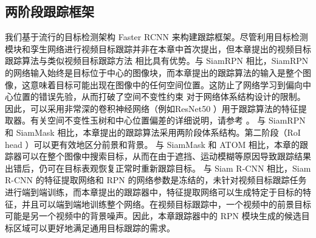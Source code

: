 \subsection{两阶段跟踪框架}

我们基于流行的目标检测架构 Faster RCNN \cite{ren2015faster} 来构建跟踪框架。尽管利用目标检测模块和孪生网络进行视频目标跟踪并非在本章中首次提出，但本章提出的视频目标跟踪算法与类似视频目标跟踪方法 \cite{SiamRPN, Wang2018SiamMask, danelljan2019atom, voigtlaender2019siam} 相比具有优势。与 SiamRPN \cite{SiamRPN}相比，SiamRPN 的网络输入始终是目标位于中心的图像块，而本章提出的跟踪算法的输入是整个图像，这意味着目标可能出现在图像中的任何空间位置。这防止了网络学习到偏向中心位置的错误先验，从而打破了空间不变性约束 \cite{SiamRPN++} 对于网络体系结构设计的限制。因此，可以采用非常深的卷积神经网络（例如ResNet50 \cite{he2016deep}）用于跟踪算法的特征提取器。有关空间不变性玉树和中心位置偏差的详细说明，请参考 \cite{SiamRPN++}。
与 SiamRPN \cite{SiamRPN} 和 SiamMask \cite{Wang2018SiamMask} 相比，本章提出的跟踪算法采用两阶段体系结构。第二阶段（RoI head \cite{ren2015faster}）可以更有效地区分前景和背景。
与 SiamMask \cite{Wang2018SiamMask} 和 ATOM \cite{danelljan2019atom} 相比，本章的跟踪器可以在整个图像中搜索目标，从而在由于遮挡、运动模糊等原因导致跟踪结果出错后，仍可在目标表观恢复正常时重新跟踪目标。
与 Siam R-CNN \cite{voigtlaender2019siam} 相比，Siam R-CNN 的特征提取网络和 RPN 的网络参数是冻结的，未针对视频目标跟踪任务进行端到端训练，而本章提出的跟踪器中，特征提取网络可以生成特定于目标的特征，并且可以端到端地训练整个网络。在视频目标跟踪中，一个视频中的前景目标可能是另一个视频中的背景噪声。因此，本章跟踪器中的 RPN 模块生成的候选目标区域可以更好地满足通用目标跟踪的需求。

